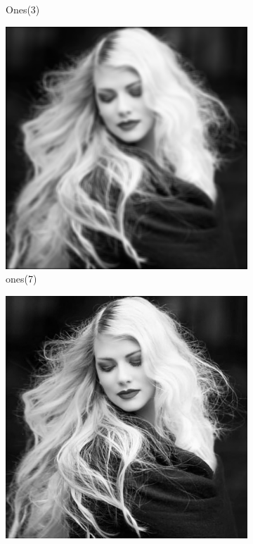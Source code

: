 \documentclass[14pt]{article}
\begin{document}
\begin{figure}[hbt!]
\begin{subfigure}[b]{0.23\linewidth}
			\caption{Ones(3)}
		\end{subfigure}
		\begin{subfigure}[b]{0.23\linewidth}
			\includegraphics[width=\linewidth]{ones7.png}
			\caption{ones(7)}
		\end{subfigure}
		\begin{subfigure}[b]{0.23\linewidth}
			\includegraphics[width=\linewidth]{g3.png}

\end{subfigure}
\end{figure}
\end{document}
